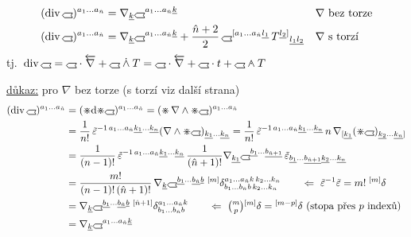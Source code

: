 \begin{veta}[Věta]
\begin{align*}
  (\mathrm{div}\,\gmIhustsym)^{a_1\dots a_{\hat n}} &= \nabla_{\underline k}\gmIhustsym^{a_1\dots a_{\hat n}\underline k}
  && \nabla\ \text{bez torze} \\
  (\mathrm{div}\,\gmIhustsym)^{a_1\dots a_{\hat n}} &= \nabla_{\underline k}\gmIhustsym^{a_1\dots a_{\hat n}\underline k}
   + \frac{\hat n+2}{2}\,\gmIhustsym^{[a_1\dots a_{\hat n}\underline{l_1}}\,T^{\underline{l_2}]}{}_{\underline{l_1}\underline{l_2}}
  && \nabla\ \text{s torzí}
\end{align*}
tj.\ \quad $\mathrm{div}\,\gmIhustsym = \gmIhustsym\cdot\overleftarrow{\nabla} + \gmIhustsym\gmIdotwedge T = \gmIhustsym\cdot\overleftarrow{\nabla} + \gmIhustsym\cdot t + \gmIhustsym\gmIwedgedot T$
\end{veta}
\underline{důkaz:} \quad pro $\nabla$ bez torze \quad (s torzí viz další strana)
\begin{align*}
  (\mathrm{div}\,\gmIhustsym)^{a_1\dots a_{\hat n}} &= (\gmIhdual\dd\gmIhdual\gmIhustsym)^{a_1\dots a_{\hat n}} = (\gmIhdual\,\nabla\wedge\gmIhdual\gmIhustsym)^{a_1\dots a_{\hat n}} \\
  &= \frac1{n!}\,\tilde\varepsilon^{-1\,a_1\dots a_{\hat n}\underline{k_1}\dots\underline{k_n}}(\nabla\wedge\gmIhdual\gmIhustsym)_{\underline{k_1}\dots\underline{k_n}}
   = \frac1{n!}\,\tilde\varepsilon^{-1\,a_1\dots a_{\hat n}\underline{k_1}\dots\underline{k_n}}\,n\,\nabla_{[\underline{k_1}}(\gmIhdual\gmIhustsym)_{\underline{k_2}\dots\underline{k_n}]} \\
  &= \frac1{(n-1)!}\,\tilde\varepsilon^{-1\,a_1\dots a_{\hat n}\underline{k_1}\dots\underline{k_n}}\,\frac1{(\hat n+1)!}\nabla_{\underline{k_1}}\gmIhustsym^{\underline{b_1}\dots\underline{b_{\hat n+1}}}\,\tilde\varepsilon_{\underline{b_1}\dots\underline{b_{\hat n+1}}\underline{k_2}\dots\underline{k_n}} \\
  &= \frac{m!}{(n-1)!\,(\hat n+1)!}\,\nabla_{\underline k}\gmIhustsym^{\underline{b_1}\dots\underline{b_{\hat n}}\underline b}\;{}^{[m]}\delta^{a_1\dots a_{\hat n}k\,k_2\dots k_n}_{b_1\dots b_{\hat n}b\,k_2\dots k_n}
  \qquad \Leftarrow\ \tilde\varepsilon^{-1}\tilde\varepsilon = m!\;{}^{[m]}\delta \\
  &= \nabla_{\underline k}\gmIhustsym^{\underline{b_1}\dots\underline{b_{\hat n}}\underline b}\;{}^{[\hat n+1]}\delta^{a_1\dots a_{\hat n}k}_{b_1\dots b_{\hat n}b}
  \qquad \Leftarrow\ \tbinom{m}{p}{}^{[m]}\delta = {}^{[m-p]}\delta \ \text{(stopa přes $p$ indexů)} \\
  &= \nabla_{\underline k}\gmIhustsym^{a_1\dots a_{\hat n}\underline k}
\end{align*}

